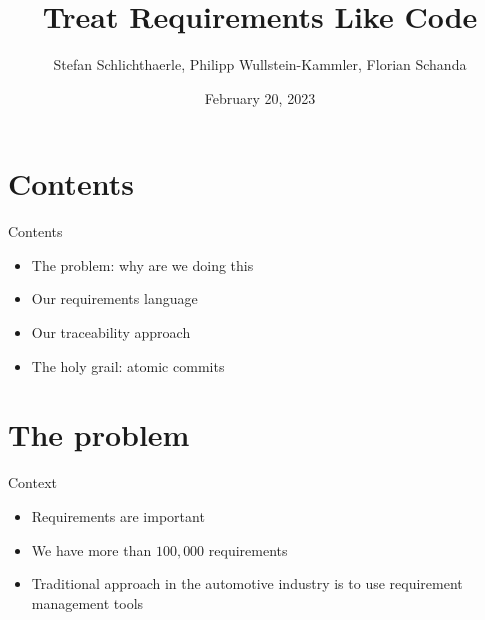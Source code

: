 \documentclass[aspectratio=169]{beamer}
\author{Stefan Schlichthaerle, Philipp Wullstein-Kammler, Florian Schanda}
\title{Treat Requirements Like Code}
\date{February 20, 2023}
\begin{document}
\maketitle

\section{Contents}
\begin{frame}{Contents}
  \begin{itemize}
  \item The problem: why are we doing this
  \item Our requirements language
  \item Our traceability approach
  \item The holy grail: atomic commits
  \end{itemize}
\end{frame}

\section{The problem}
\begin{frame}{Context}
  \begin{itemize}
  \item Requirements are important
  \item We have more than $100,000$ requirements
  \item Traditional approach in the automotive industry is to use
    requirement management tools
  \end{itemize}
  \begin{center}
  \end{center}
\end{frame}
\end{document}
